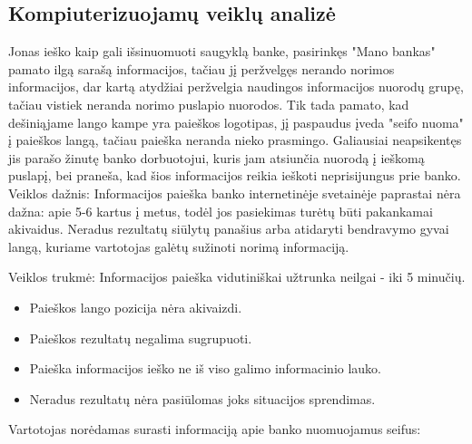 \documentclass{VUMIFPSkursinis}
\begin{document}
\subsection{Kompiuterizuojamų veiklų analizė}
Jonas ieško kaip gali išsinuomuoti saugyklą banke, pasirinkęs "Mano bankas" pamato ilgą sarašą informacijos, tačiau jį peržvelgęs nerando norimos informacijos, dar kartą atydžiai peržvelgia naudingos informacijos nuorodų grupę, tačiau vistiek neranda norimo puslapio nuorodos. Tik tada pamato, kad dešiniąjame lango kampe yra paieškos logotipas, jį paspaudus įveda "seifo nuoma" į paieškos langą, tačiau paieška neranda nieko prasmingo. Galiausiai neapsikentęs jis parašo žinutę banko dorbuotojui, kuris jam atsiunčia nuorodą į ieškomą puslapį, bei praneša, kad šios informacijos reikia ieškoti neprisijungus prie banko. 
Veiklos dažnis: Informacijos paieška banko internetinėje svetainėje paprastai nėra dažna: apie 5-6 kartus į metus, todėl jos pasiekimas turėtų būti pakankamai akivaidus. Neradus rezultatų siūlytų panašius arba atidaryti bendravymo gyvai langą, kuriame vartotojas galėtų sužinoti norimą informaciją. \par
Veiklos trukmė: Informacijos paieška vidutiniškai užtrunka neilgai - iki 5 minučių.
\begin{itemize}
	\item Paieškos lango pozicija nėra akivaizdi.
	\item Paieškos rezultatų negalima sugrupuoti.
	\item Paieška informacijos ieško ne iš viso galimo informacinio lauko.
	\item Neradus rezultatų nėra pasiūlomas joks situacijos sprendimas.
\end{itemize}
\begin{center}
Vartotojas norėdamas surasti informaciją apie banko nuomuojamus seifus:
\end{center}
\end{document}
